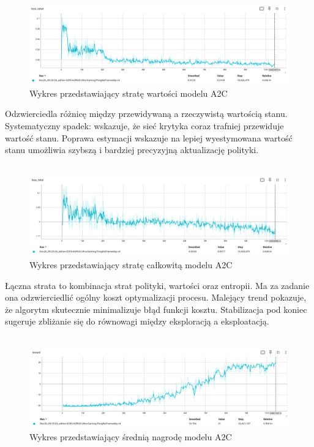 \documentclass[a4paper, 12pt]{article}
\numberwithin{equation}{section}
\begin{document}
    \\ \\ 
    \begin{figure}[H]
        \centering
        \includegraphics[width=\textwidth]{pictures/A2C_loss_value.png}
        \caption{Wykres przedstawiający stratę wartości modelu A2C}
    \end{figure}
    Odzwierciedla różnicę między przewidywaną a rzeczywistą wartością stanu. Systematyczny spadek: wskazuje, że sieć krytyka coraz trafniej przewiduje wartość stanu.
    Poprawa estymacji wskazuje na lepiej wyestymowana wartość stanu umożliwia szybszą i bardziej precyzyjną aktualizację polityki.
    \\ \\ 
    \begin{figure}[H]
        \centering
        \includegraphics[width=\textwidth]{pictures/A2C_loss_total.png}
        \caption{Wykres przedstawiający stratę całkowitą modelu A2C}
    \end{figure}
    Łączna strata to kombinacja strat polityki, wartości oraz entropii. Ma za zadanie
    ona odzwierciedlić ogólny koszt optymalizacji procesu.
    Malejący trend pokazuje, że algorytm skutecznie minimalizuje błąd funkcji kosztu.
    Stabilizacja pod koniec sugeruje zbliżanie się do równowagi między eksploracją a eksploatacją.
    \\ \\ 
    \begin{figure}[H]
        \centering
        \includegraphics[width=\textwidth]{pictures/A2C_reward.png}
        \caption{Wykres przedstawiający średnią nagrodę modelu A2C}
    \end{figure}
\end{document}
